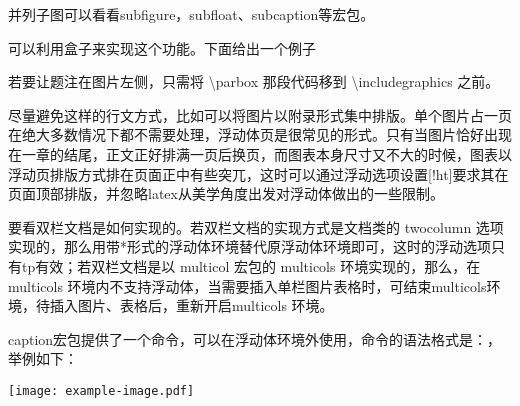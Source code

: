 
并列子图可以看看subfigure，subfloat、subcaption等宏包。



可以利用盒子来实现这个功能。下面给出一个例子


若要让题注在图片左侧，只需将 \textbackslash{}parbox 那段代码移到
\textbackslash{}includegraphics 之前。



尽量避免这样的行文方式，比如可以将图片以附录形式集中排版。单个图片占一页在绝大多数情况下都不需要处理，浮动体页是很常见的形式。只有当图片恰好出现在一章的结尾，正文正好排满一页后换页，而图表本身尺寸又不大的时候，图表以浮动页排版方式排在页面正中有些突兀，这时可以通过浮动选项设置{[}!ht{]}要求其在页面顶部排版，并忽略latex从美学角度出发对浮动体做出的一些限制。



要看双栏文档是如何实现的。若双栏文档的实现方式是文档类的 twocolumn
选项实现的，那么用带*形式的浮动体环境替代原浮动体环境即可，这时的浮动选项只有tp有效；若双栏文档是以
multicol 宏包的 multicols 环境实现的，那么，在 multicols
环境内不支持浮动体，当需要插入单栏图片表格时，可结束multicols环境，待插入图片、表格后，重新开启multicols
环境。



caption宏包提供了一个命令，可以在浮动体环境外使用，命令的语法格式是：，举例如下：

\begin{texinlist}
\begin{center}
\texttt{[image: example-image.pdf]}
\end{center}
\end{texinlist}

